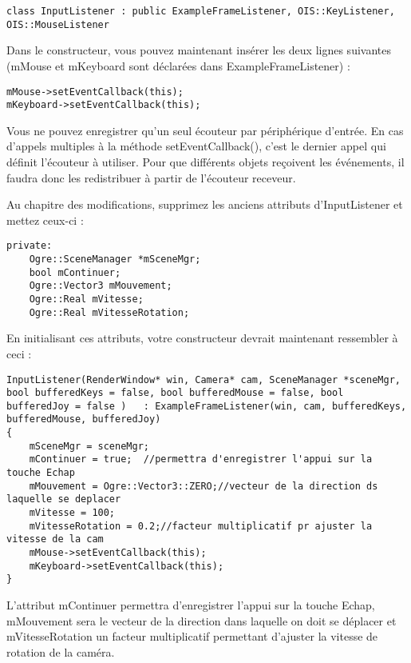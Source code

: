 \begin{lstlisting}[caption={Classes mères pour gestion des Listeners}]
class InputListener : public ExampleFrameListener, OIS::KeyListener, OIS::MouseListener
\end{lstlisting}

Dans le constructeur, vous pouvez maintenant insérer les deux lignes suivantes (mMouse et mKeyboard sont déclarées dans ExampleFrameListener) :

\begin{lstlisting}[caption={Enregistrement des listener}]
mMouse->setEventCallback(this);
mKeyboard->setEventCallback(this);
\end{lstlisting}

Vous ne pouvez enregistrer qu'un seul écouteur par périphérique d'entrée. En cas d'appels multiples à la méthode setEventCallback(), c'est le dernier appel qui définit l'écouteur à utiliser. Pour que différents objets reçoivent les événements, il faudra donc les redistribuer à partir de l'écouteur receveur.

Au chapitre des modifications, supprimez les anciens attributs d'InputListener et mettez ceux-ci :

\begin{lstlisting}[caption={Attributs d'InputListener}]
private:
    Ogre::SceneManager *mSceneMgr;
    bool mContinuer;
    Ogre::Vector3 mMouvement;
    Ogre::Real mVitesse;
    Ogre::Real mVitesseRotation;
\end{lstlisting}

En initialisant ces attributs, votre constructeur devrait maintenant ressembler à ceci :

\begin{lstlisting}[caption={Constructeur d'InputListener}]
InputListener(RenderWindow* win, Camera* cam, SceneManager *sceneMgr, bool bufferedKeys = false, bool bufferedMouse = false, bool bufferedJoy = false )   : ExampleFrameListener(win, cam, bufferedKeys, bufferedMouse, bufferedJoy)
{
    mSceneMgr = sceneMgr;
    mContinuer = true;  //permettra d'enregistrer l'appui sur la touche Echap
    mMouvement = Ogre::Vector3::ZERO;//vecteur de la direction ds laquelle se deplacer
    mVitesse = 100;
    mVitesseRotation = 0.2;//facteur multiplicatif pr ajuster la vitesse de la cam 
    mMouse->setEventCallback(this);
    mKeyboard->setEventCallback(this);
}
\end{lstlisting}

L'attribut mContinuer permettra d'enregistrer l'appui sur la touche Echap, mMouvement sera le vecteur de la direction dans laquelle on doit se déplacer et mVitesseRotation un facteur multiplicatif permettant d'ajuster la vitesse de rotation de la caméra.

